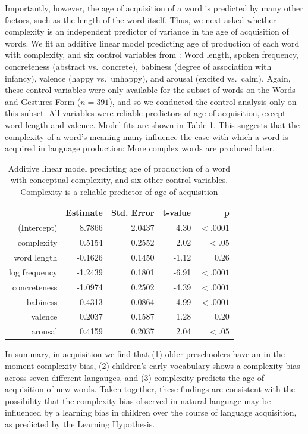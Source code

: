 Importantly, however, the age of acquisition of a word is predicted by many other factors, such as the length of the word itself. Thus, we next asked whether complexity is an independent predictor of variance in the age of acquisition of words. We fit an additive linear model predicting age of production of each word with complexity, and six control variables from : Word length, spoken frequency, concreteness (abstract vs.\ concrete), babiness (degree of association with infancy), valence (happy vs.\ unhappy), and arousal (excited vs.\ calm).  Again, these control variables were only available for the subset of words on the Words and Gestures Form ($n = 391$), and so we conducted the control analysis only on this subset. All variables were reliable predictors of age of acquisition, except word length and valence. Model fits are shown in Table \ref{tab:aoapred}. This suggests that the complexity of a word's meaning many influence the ease with which a word is acquired in language production: More complex words are produced later.

\begin{table}[t!]
\centering
\begin{tabular}{rrrrr}
  \hline
 & Estimate & Std. Error & t-value & p\\ 
  \hline
(Intercept) & 8.7866 & 2.0437 & 4.30 & $<.0001$ \\ 
  complexity & 0.5154 & 0.2552 & 2.02 & $<.05$ \\ 
  word length & -0.1626 & 0.1450 & -1.12 & 0.26\\ 
  log frequency  & -1.2439 & 0.1801 & -6.91 & $<.0001$ \\ 
  concreteness & -1.0974 & 0.2502 & -4.39 & $<.0001$\\ 
  babiness & -0.4313 & 0.0864 & -4.99 &$<.0001$\\ 
  valence & 0.2037 & 0.1587 & 1.28 & 0.20 \\ 
  arousal & 0.4159 & 0.2037 & 2.04 &$ <.05$ \\ 
   \hline
\end{tabular}
\caption{Additive linear model predicting age of production of a word with conceptual complexity, and six other control variables. Complexity is a reliable predictor of age of acquisition}
  \label{tab:aoapred}
\end{table}

In summary, in acquisition we find that (1) older preschoolers have an in-the-moment complexity bias, (2) children's early vocabulary shows a complexity bias across seven different langauges, and (3) complexity predicts the age of acquisition of new words. Taken together, these findings are consistent with the possibility that the  complexity bias observed in natural language may be influenced by a learning bias in children over the course of language acquisition, as predicted by the Learning Hypothesis. 



